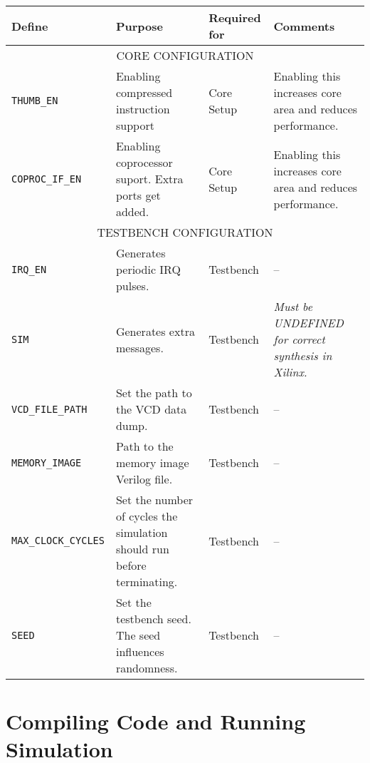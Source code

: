 \documentclass[11pt]{article}
\begin{document}
\begin{tabularx}{\textwidth}{| X | X | X | X |} 
\hline
Define & Purpose & Required for & Comments \\  
\hline
\multicolumn{4}{c}{CORE CONFIGURATION} \\
\hline
\texttt{THUMB\_EN} & Enabling compressed instruction support & Core Setup & 
Enabling this increases core area and reduces performance. \\ 
\texttt{COPROC\_IF\_EN} & Enabling coprocessor suport. Extra ports get added. &
 Core Setup & Enabling this increases core area and reduces performance. \\
\hline
\multicolumn{4}{c}{TESTBENCH CONFIGURATION} \\
\hline
\texttt{IRQ\_EN} & Generates periodic IRQ pulses. & Testbench & -- \\
\texttt{SIM} & Generates extra messages. & Testbench & \emph{Must be UNDEFINED 
for correct synthesis in Xilinx.} \\
\texttt{VCD\_FILE\_PATH} & Set the path to the VCD data dump. & Testbench & -- \\
\texttt{MEMORY\_IMAGE} & Path to the memory image Verilog file. & Testbench & 
-- \\
\texttt{MAX\_CLOCK\_CYCLES} & Set the number of cycles the simulation should 
run before terminating. & Testbench & -- \\
\texttt{SEED} & Set the testbench seed. The seed influences randomness. & 
Testbench & -- \\
\hline
\end{tabularx}


\pagebreak
\section{Compiling Code and Running Simulation}
\end{document}

